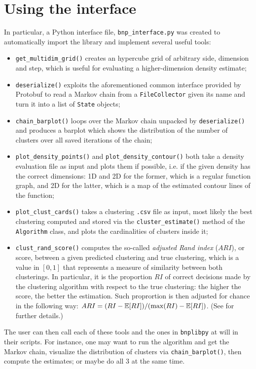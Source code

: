 \section{Using the interface}
In particular, a Python interface file, \verb|bnp_interface.py| was created to automatically import the library and implement several useful tools:
\begin{itemize}
	\item \verb|get_multidim_grid()| creates an hypercube grid of arbitrary side, dimension and step, which is useful for evaluating a higher-dimension density estimate;
	\item \verb|deserialize()| exploits the aforementioned common interface provided by Protobuf to read a Markov chain from a \verb|FileCollector| given its name and turn it into a list of \verb|State| objects;
	\item \verb|chain_barplot()| loops over the Markov chain unpacked by \verb|deserialize()| and produces a barplot which shows the distribution of the number of clusters over all saved iterations of the chain;
	\item \verb|plot_density_points()| and \verb|plot_density_contour()| both take a density evaluation file as input and plots them if possible, i.e. if the given density has the correct dimensions: 1D and 2D for the former, which is a regular function graph, and 2D for the latter, which is a map of the estimated contour lines of the function;
	\item \verb|plot_clust_cards()| takes a clustering \verb|.csv| file as input, most likely the best clustering computed and stored via the \verb|cluster_estimate()| method of the \verb|Algorithm| class, and plots the cardinalities of clusters inside it;
	\item \verb|clust_rand_score()| computes the so-called \emph{adjusted Rand index} ($ARI$), or score, between a given predicted clustering and true clustering, which is a value in $[0,1]$ that represents a measure of similarity between both clusterings.
	In particular, it is the proportion $RI$ of correct decisions made by the clustering algorithm with respect to the true clustering: the higher the score, the better the estimation.
	Such proprortion is then adjusted for chance in the following way:
	$ARI = (RI - \mathbb E[RI]) / (\max(RI) - \mathbb E[RI])$.
	(See \cite{rand} for further details.)
\end{itemize}
The user can then call each of these tools and the ones in \verb|bnplibpy| at will in their scripts.
For instance, one may want to run the algorithm and get the Markov chain, visualize the distribution of clusters via \verb|chain_barplot()|, then compute the estimates; or maybe do all 3 at the same time.
